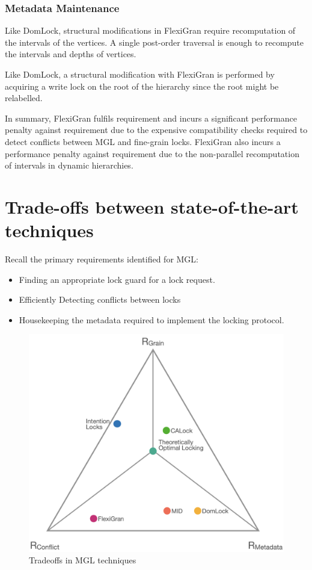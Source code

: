 \subsubsection{Metadata Maintenance}

Like DomLock, structural modifications in FlexiGran require recomputation of the intervals of the vertices. A single post-order traversal is enough to recompute the intervals and depths of vertices. 

Like DomLock, a structural modification with FlexiGran is performed by acquiring a write lock on the root of the hierarchy since the root might be relabelled.

In summary, FlexiGran fulfils requirement \Rb and incurs a significant performance penalty against requirement \Rc due to the expensive compatibility checks required to detect conflicts between MGL and fine-grain locks. FlexiGran also incurs a performance penalty against requirement \Rd due to the non-parallel recomputation of intervals in dynamic hierarchies.



\section{Trade-offs between state-of-the-art techniques}

Recall the primary requirements identified for MGL:
\begin{itemize}
    \item[\Rb] Finding an appropriate lock guard for a lock request.
    \item[\Rc] Efficiently Detecting conflicts between locks
    \item[\Rd] Housekeeping the metadata required to implement the locking protocol.
\end{itemize}

\begin{figure}[h]
    \centering
    \captionsetup{justification=centering}
    \includegraphics[width=.9\textwidth]{figures/MGL_comparision.png}
    \caption{Tradeoffs in MGL techniques}
    \label{fig:tradeoffs}
\end{figure}


